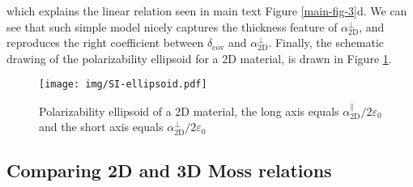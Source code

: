 \documentclass[manuscript=suppinfo,email=true,hyperref=true,keywords=false]{achemso}
\begin{document}
which explains the linear relation seen in main text Figure
\ref{main-fig-3}d. We can see that such simple model nicely captures
the thickness feature of $\alpha_{\mathrm{2D}}^{\perp}$, and
reproduces the right coefficient between $\delta_{\mathrm{cov}}$ and
$\alpha_{\mathrm{2D}}^{\perp}$. Finally, the schematic drawing of the
polarizability ellipsoid for a 2D material, is drawn in Figure
\ref{fig:ellipsoid}.
\begin{figure}[htbp]
  \centering
  \texttt{[image: img/SI-ellipsoid.pdf]}
  \caption{Polarizability ellipsoid of a 2D material, the long axis
    equals $\alpha_{\mathrm{2D}}^{\parallel}/2\varepsilon_{0}$ and the short axis
    equals  $\alpha_{\mathrm{2D}}^{\perp}/2\varepsilon_{0}$}
  \label{fig:ellipsoid}
\end{figure}

\subsection{Comparing 2D and 3D Moss relations}
\label{ssec:theory-2}
\end{document}
